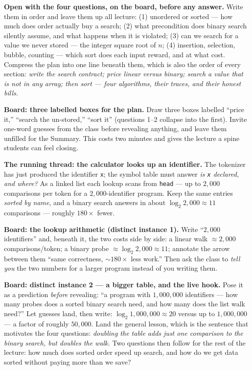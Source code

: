 \documentclass[11pt]{article}
\begin{document}
\textbf{Open with the four questions, on the board, before any answer.} Write them in order and leave them up all lecture: (1) unordered or sorted --- how much does order actually buy a search; (2) what precondition does binary search silently assume, and what happens when it is violated; (3) can we search for a value we never stored --- the integer square root of $n$; (4) insertion, selection, bubble, counting --- which sort does each input reward, and at what cost. Compress the plan into one line beneath them, which is also the order of every section: \emph{write the search contract; price linear versus binary; search a value that is not in any array; then sort --- four algorithms, their traces, and their honest bills.}

\textbf{Board: three labelled boxes for the plan.} Draw three boxes labelled ``price it,'' ``search the un-stored,'' ``sort it'' (questions 1--2 collapse into the first). Invite one-word guesses from the class before revealing anything, and leave them unfilled for the Summary. This costs two minutes and gives the lecture a spine students can feel closing.

\textbf{The running thread: the calculator looks up an identifier.} The tokenizer has just produced the identifier \texttt{x}; the symbol table must answer \emph{is \texttt{x} declared, and where?} As a linked list each lookup scans from \texttt{head} --- up to $2{,}000$ comparisons per token for a $2{,}000$-identifier program. Keep the same entries \emph{sorted by name}, and a binary search answers in about $\log_2 2{,}000 \approx 11$ comparisons --- roughly $180\times$ fewer.

\textbf{Board: the lookup arithmetic (distinct instance 1).} Write ``$2{,}000$ identifiers'' and, beneath it, the two costs side by side: a linear walk $\approx 2{,}000$ comparisons/token; a binary probe $\approx \log_2 2{,}000 \approx 11$; annotate the arrow between them ``same correctness, $\sim\!180\times$ less work.'' Then ask the class to \emph{tell you} the two numbers for a larger program instead of you writing them.

\textbf{Board: distinct instance 2 --- a bigger table, and the live hook.} Pose it as a prediction \emph{before} revealing: ``a program with $1{,}000{,}000$ identifiers --- how many probes does a sorted binary search need, and how many does the list walk need?'' Let guesses land, then write: $\log_2 1{,}000{,}000 \approx 20$ versus up to $1{,}000{,}000$ --- a factor of roughly $50{,}000$. Land the general lesson, which is the sentence that motivates the four questions: \emph{doubling the table adds just one comparison to the binary search, but doubles the walk.} Two questions then follow for the rest of the lecture: how much does sorted order speed up search, and how do we get data sorted without paying more than we save?
\end{document}
